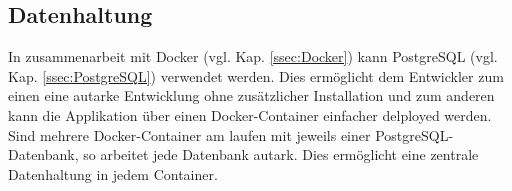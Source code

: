 \subsection{Datenhaltung}
\label{ssec:Datenhaltung}

In zusammenarbeit mit Docker (vgl. Kap. \vref{ssec:Docker}) kann PostgreSQL (vgl. Kap. \vref{ssec:PostgreSQL}) verwendet werden. 
Dies ermöglicht dem Entwickler zum einen eine autarke Entwicklung ohne zusätzlicher Installation und zum anderen kann die Applikation über einen Docker-Container einfacher delployed werden. 
Sind mehrere Docker-Container am laufen mit jeweils einer PostgreSQL-Datenbank, so arbeitet jede Datenbank autark. 
Dies ermöglicht eine zentrale Datenhaltung in jedem Container. 

